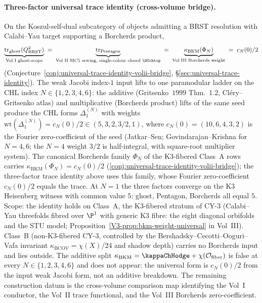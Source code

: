 \paragraph{Three-factor universal trace identity
(cross-volume bridge).}
On the Koszul-self-dual subcategory of objects admitting a
BRST resolution with Calabi--Yau target supporting a Borcherds
product,
\[
 \underbrace{\mathrm{tr}_{\mathrm{ghost}}(Q_{\mathrm{BRST}}^2)}_{\text{Vol~I ghost-scope}}
 \;=\;\underbrace{\mathrm{tr}_{\mathrm{Pentagon}}}_{\text{Vol~II MC5 sewing, single-colour closed $\SCchtop$}}
 \;=\;\underbrace{\kappa_{\mathrm{BKM}}(\Phi_N)}_{\text{Vol~III Borcherds weight}}
 \;=\;c_N(0)/2
\]
(Conjecture~\ref{conj:universal-trace-identity-volii-bridge},
\S\ref{sec:universal-trace-identity}).
The weak Jacobi index-$1$ input lifts to one paramodular ladder
on the CHL index $N \in \{1,2,3,4,6\}$: the additive
(Gritsenko~$1999$ Thm.~$1.2$, Cl\'ery--Gritsenko atlas) and
multiplicative (Borcherds product) lifts of the same seed produce
the CHL forms $\Delta_1^{(N)}$ with weights
$\mathrm{wt}(\Delta_1^{(N)}) = c_N(0)/2 \in (5, 3, 2, 3/2, 1)$,
where $c_N(0) = (10, 6, 4, 3, 2)$ is the Fourier zero-coefficient
of the seed (Jatkar--Sen; Govindarajan--Krishna for $N = 4, 6$;
the $N = 4$ weight $3/2$ is half-integral, with square-root
multiplier system). The canonical Borcherds family $\Phi_N$ of the
K3-fibered Class~A rows carries
$\kappa_{\mathrm{BKM}}(\Phi_N) = c_N(0)/2$
(\cref{conj:universal-trace-identity-volii-bridge}); the
three-factor trace identity above uses this family, whose Fourier
zero-coefficient $c_N(0)/2$ equals the trace.
At $N = 1$ the three
factors converge on the K3 Heisenberg witness with common value
$5$: ghost, Pentagon, Borcherds all equal $5$. Scope: the
identity holds on Class~A, the K3-fibered stratum of CY-$3$
(Calabi--Yau threefolds fibred over $\P^1$ with generic K3
fibre: the eight diagonal orbifolds and the STU model;
Proposition~\ref{V3-prop:bkm-weight-universal} in Vol~III).
Class~B (non-K3-fibered CY-$3$, controlled by the
Bershadsky--Cecotti--Ooguri--Vafa invariant
$\kappa_{\mathrm{BCOV}} = \chi(X)/24$ and shadow depth) carries
no Borcherds input and lies outside. The additive split
$\kappa_{\mathrm{BKM}} = \kappaChHodge
+ \chi(\mathcal{O}_{\mathrm{fiber}})$ is false at every
$N \in \{1, 2, 3, 4, 6\}$ and does not appear: the universal
form is $c_N(0)/2$ from the input weak Jacobi form, not an
additive breakdown. The remaining construction datum is the
cross-volume comparison map identifying the Vol~I conductor, the
Vol~II trace functional, and the Vol~III Borcherds zero-coefficient.


